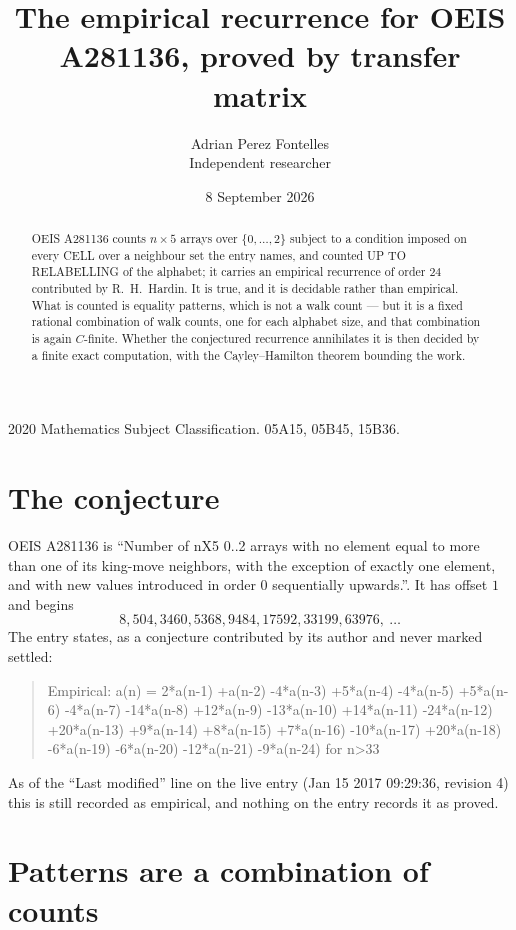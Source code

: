 \documentclass[11pt,a4paper]{article}
\title{The empirical recurrence for OEIS A281136, proved by transfer matrix}
\author{Adrian Perez Fontelles\\ \small Independent researcher}
\date{8 September 2026}
\theoremstyle{plain}
\theoremstyle{definition}
\begin{document}
\maketitle

\begin{abstract}
OEIS A281136 counts $n\times5$ arrays over $\{0,\dots,2\}$ subject to a condition imposed on
every CELL over a neighbour set the entry names, and counted UP TO RELABELLING of the
alphabet; it carries an empirical recurrence of order $24$ contributed by
R.~H.~Hardin. It is true, and it is decidable rather than empirical. What is counted is
equality patterns, which is not a walk count --- but it is a fixed rational combination of
walk counts, one for each alphabet size, and that combination is again $C$-finite. Whether the
conjectured recurrence annihilates it is then decided by a finite exact computation, with the
Cayley--Hamilton theorem bounding the work.
\end{abstract}

\noindent\small 2020 Mathematics Subject Classification. 05A15, 05B45, 15B36.\normalsize

\section{The conjecture}

OEIS A281136 is ``Number of nX5 0..2 arrays with no element equal to more than one of its king-move neighbors, with the exception of exactly one element, and with new values introduced in order 0 sequentially upwards.''. It has offset $1$ and begins
\[
8, 504, 3460, 5368, 9484, 17592, 33199, 63976,\ \dots
\]
The entry states, as a conjecture contributed by its author and never marked settled:
\begin{quote}
Empirical: a(n) = 2*a(n-1) +a(n-2) -4*a(n-3) +5*a(n-4) -4*a(n-5) +5*a(n-6) -4*a(n-7) -14*a(n-8) +12*a(n-9) -13*a(n-10) +14*a(n-11) -24*a(n-12) +20*a(n-13) +9*a(n-14) +8*a(n-15) +7*a(n-16) -10*a(n-17) +20*a(n-18) -6*a(n-19) -6*a(n-20) -12*a(n-21) -9*a(n-24) for n>33
\end{quote}
As of the ``Last modified'' line on the live entry (Jan 15 2017 09:29:36, revision 4) this is still
recorded as empirical, and nothing on the entry records it as proved.

\section{Patterns are a combination of counts}
\end{document}
